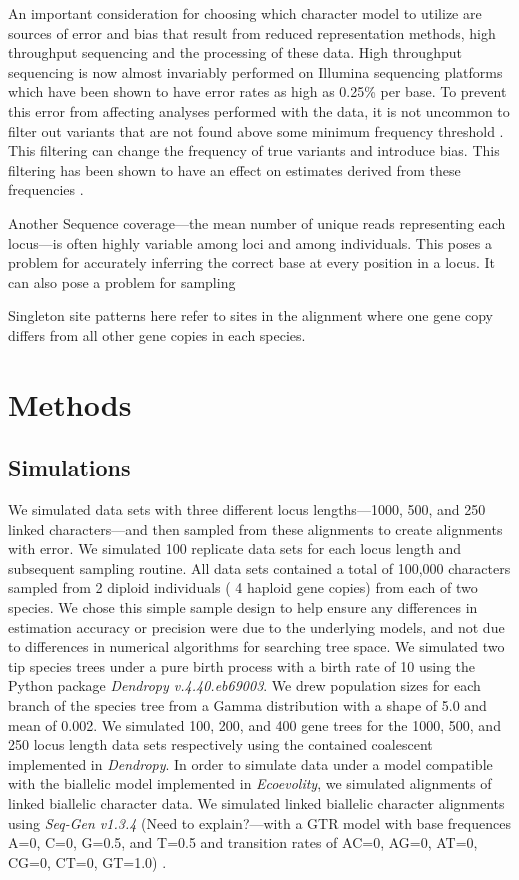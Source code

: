 An important consideration for choosing which character model to utilize are
sources of error and bias that result from reduced representation methods,
high throughput sequencing and the processing of these data. High throughput
sequencing is now almost invariably performed on Illumina sequencing platforms
which have been shown to have error rates as high as 0.25\% per base. 
To prevent this error from affecting analyses performed with the data, it is not 
uncommon to filter out variants that are not found above some minimum frequency 
threshold \citep{rochetteStacksAnalyticalMethods2019, linckMinorAlleleFrequency2019}. 
This filtering can change the frequency of true variants and introduce bias. 
This filtering has been shown to have an effect on estimates derived from these 
frequencies \citep{linckMinorAlleleFrequency2019}.

Another 
Sequence coverage---the mean number of unique reads representing each locus---is
often highly variable among loci and among individuals. This poses a problem for
accurately inferring the correct base at every position in a locus. It can also
pose a problem for sampling 


	
Singleton site patterns here refer to sites in the alignment where one gene 
copy differs from all other gene copies in each species.


\section{Methods}
\subsection{Simulations}
We simulated data sets with three different locus lengths—1000, 500, and 250 
linked characters—and then sampled from these alignments to create alignments 
with  error. We simulated 100 replicate data sets for each locus length and 
subsequent sampling routine. All data sets contained a total of 100,000 
characters sampled from 2 diploid individuals ( 4 haploid gene copies) from each 
of two species. We chose this simple sample design to help ensure any 
differences in estimation accuracy or precision were due to the underlying 
models, and not due to differences in numerical algorithms for searching tree 
space.  We simulated two tip species trees under a pure birth process with a 
birth rate of 10 using the Python package \textit{Dendropy v.4.40.eb69003}.  
We drew population sizes for each branch of the species tree from a Gamma 
distribution with a shape of 5.0 and mean of 0.002. We simulated 100, 200, and 
400 gene trees for the 1000, 500, and 250 locus length data sets respectively 
using the contained coalescent implemented in \textit{Dendropy}. In order to 
simulate data under a model compatible with the biallelic model implemented in 
\textit{Ecoevolity}, we simulated alignments of linked biallelic character data. 
We simulated linked biallelic character alignments using \textit{Seq-Gen v1.3.4} 
(Need to explain?---with a GTR model with base frequences {A=0, C=0, G=0.5, 
and T=0.5} and  transition rates of {AC=0, AG=0, AT=0, CG=0, CT=0, GT=1.0}) . 

